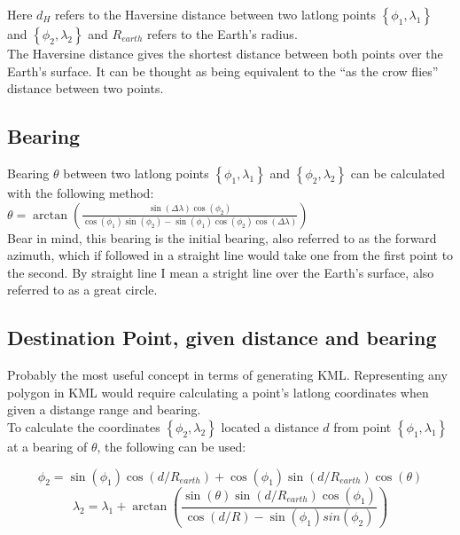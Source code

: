 Here $d_{H}$ refers to the Haversine distance between two latlong points $\left\{\phi_{1},\lambda_{1}\right\}$ and $\left\{\phi_{2},\lambda_{2}\right\}$ and $R_{earth}$ refers to the Earth's radius.\\

The Haversine distance gives the shortest distance between both points over the Earth's surface. It can be thought as being equivalent to the ``as the crow flies'' distance between two points.


\subsection{Bearing}

Bearing $\theta$ between two latlong points $\left\{\phi_{1},\lambda_{1}\right\}$ and $\left\{\phi_{2},\lambda_{2}\right\}$ can be calculated with the following method\citep{latlong}: \\
$
\theta = \arctan(\frac{\sin(\Delta \lambda) \cos(\phi_{2})}{\cos(\phi_{1}) \sin(\phi_{2}) - \sin(\phi_{1})\cos(\phi_{2}) \cos(\Delta \lambda)})
$
\\
Bear in mind, this bearing is the initial bearing, also referred to as the forward azimuth, which if followed in a straight line would take one from the first point to the second. By straight line I mean a stright line over the Earth's surface, also referred to as a great circle. \\

\subsection{Destination Point, given distance and bearing}

Probably the most useful concept in terms of generating KML. Representing any polygon in KML would require calculating a point's latlong coordinates when given a distange range and bearing. \\

To calculate the coordinates $\left\{ \phi_{2},\lambda_{2}\right\}$ located a distance $d$ from point $\left\{ \phi_{1},\lambda_{1}\right\}$ at a bearing of $\theta$, the following can be used\citep{latlong}:

\begin{equation}
  \phi_{2} = \sin(\phi_{1}) \cos(d/R_{earth}) + \cos(\phi_{1})\sin(d/R_{earth})\cos(\theta)
\end{equation}
\begin{equation}
  \lambda_{2} = \lambda_{1} + \arctan(\frac{\sin(\theta) \sin(d/R_{earth}) \cos(\phi_{1})}
                                         {\cos(d/R) - \sin(\phi_{1}) sin(\phi_{2})})
\end{equation}

